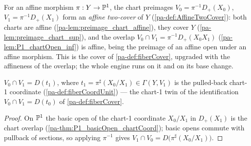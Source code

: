 \begin{definition}
  \label{pa-def:fiberTwoCover}
  \leanok

  For an affine morphism \(\pi : Y \to \mathbb{P}^1\), the chart preimages
  \(V_0 = \pi^{-1}D_+(X_0)\), \(V_1 = \pi^{-1}D_+(X_1)\) form an \emph{affine two-cover}
  of \(Y\) (\ref{pa-def:AffineTwoCover}): both charts are affine
  (\ref{pa-lem:preimage_chart_affine}), they cover \(Y\)
  (\ref{pa-lem:preimage_chart_sup}), and the overlap
  \(V_0 \cap V_1 = \pi^{-1}D_+(X_0 X_1)\) (\ref{pa-lem:P1_chartOpen_inf}) is affine, being
  the preimage of an affine open under an affine morphism. This is the cover of
  \ref{pa-def:fiberCover}, upgraded with the affineness of the overlap; the whole engine
  runs on it and on its base change.
\end{definition}

\begin{theorem}
  \label{pa-thm:preimage_inf_eq_basicOpen_fiberCoord1}
  \leanok

  \(V_0 \cap V_1 = D(t_1)\), where \(t_1 = \pi^{\sharp}(X_0/X_1) \in \Gamma(Y, V_1)\)
  is the pulled-back chart-1 coordinate (\ref{pa-def:fiberCoordUnit}) --- the chart-1 twin
  of the identification \(V_0 \cap V_1 = D(t_0)\) of \ref{pa-def:fiberCover}.
\end{theorem}
\begin{proof}
  \leanok
  On \(\mathbb{P}^1\) the basic open of the chart-1 coordinate \(X_0/X_1\) in \(D_+(X_1)\) is
  the chart overlap (\ref{pa-thm:P1_basicOpen_chartCoord}); basic opens commute with
  pullback of sections, so applying \(\pi^{-1}\) gives
  \(V_1 \cap V_0 = D\bigl(\pi^{\sharp}(X_0/X_1)\bigr)\).
\end{proof}

